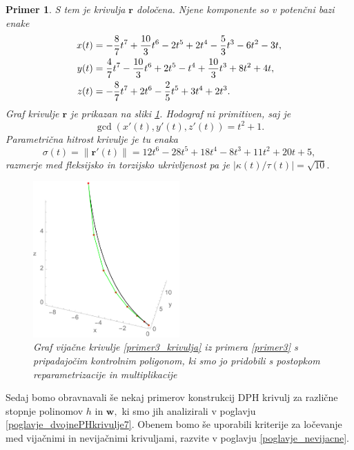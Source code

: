 \documentclass[12pt,a4paper,twoside]{article}
\theoremstyle{definition} %
\theoremstyle{plain} %
\theoremstyle{primerstyle}
\newtheorem{primer}[definicija]{Primer}
\numberwithin{equation}{section}  %
\newcommand{\rV}{\mathbf{r}}
\newcommand{\wV}{\mathbf{w}}
\begin{document}
\begin{primer}
	S tem je krivulja $\rV$ določena. Njene komponente so v potenčni bazi enake
	\begin{align}
		x(t)&=-\frac{8}{7}t^7+\frac{10}{3}t^6-2t^5+2t^4-\frac{5}{3}t^3-6t^2-3t,\notag\\
		y(t)&=\frac{4}{7}t^7-\frac{10}{3}t^6+2t^5-t^4+\frac{10}{3}t^3+8t^2+4t,\label{primer3_krivulja}\\
		z(t)&=-\frac{8}{7}t^7+2t^6-\frac{2}{5}t^5+3t^4+2t^3.\notag
	\end{align}
	Graf krivulje $\rV$ je prikazan na sliki \ref{fig:reparametrization_multi}.
	Hodograf ni primitiven, saj je $$\gcd(x'(t),y'(t),z'(t))=t^2+1.$$ Parametrična hitrost krivulje je tu enaka
	\begin{equation*}
		\sigma(t)=\lVert\rV'(t)\rVert=12t^6-28t^5+18t^4-8t^3+11t^2+20t+5,
	\end{equation*}
	razmerje med fleksijsko in torzijsko ukrivljenost pa je $|\kappa(t)/\tau(t)|=\sqrt{10}.$
	\begin{figure}[h!]
	  \centering
	  \includegraphics[width=0.5\textwidth]{images/reparametrization_multi.pdf}
	  \caption[Primer vijačne krivulje, pridobljene s postopkom reparametrizacije in multiplikacije]{Graf vijačne krivulje \eqref{primer3_krivulja} iz primera \ref{primer3} s pripadajočim kontrolnim poligonom, ki smo jo pridobili s postopkom reparametrizacije in multiplikacije}
	  \label{fig:reparametrization_multi}
	\end{figure}
\end{primer}

Sedaj bomo obravnavali še nekaj primerov konstrukcij DPH krivulj za različne stopnje polinomov $h$ in $\wV,$ ki smo jih analizirali v poglavju \ref{poglavje_dvojnePHkrivulje7}. Obenem bomo še uporabili kriterije za ločevanje med vijačnimi in nevijačnimi krivuljami, razvite v poglavju \ref{poglavje_nevijacne}.
\end{document}
